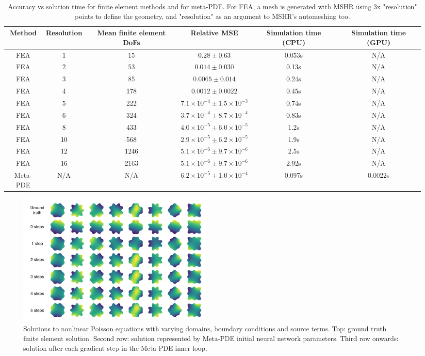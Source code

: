 \begin{table}
\begin{adjustbox}{max width=\textwidth}
\begin{tabular}{|c|ccccc|}
 \hline
 Method & Resolution & Mean finite element DoFs & Relative MSE & Simulation time (CPU) & Simulation time (GPU) \\
 \hline
 FEA & 1 & 15 & $0.28 \pm 0.63$ & 0.053s & N/A \\
 FEA & 2 & 53 & $0.014 \pm 0.030$ & 0.13s & N/A \\
 FEA & 3 & 85 & $0.0065 \pm 0.014$ & 0.24s & N/A \\
 FEA & 4 & 178 & $0.0012 \pm 0.0022$ & 0.45s & N/A \\
 FEA & 5 & 222 & $7.1\times 10^{-4} \pm 1.5\times 10^{-3}$ & 0.74s & N/A \\
 FEA & 6 & 324 & $3.7\times 10^{-4} \pm 8.7\times 10^{-4}$ & 0.83s & N/A \\
 FEA & 8 & 433 & $4.0\times 10^{-5} \pm 6.0\times 10^{-5}$ & 1.2s & N/A \\
 FEA & 10 & 568 & $2.9\times 10^{-5} \pm 6.2\times 10^{-5}$ & 1.9s & N/A \\
 FEA & 12 & 1246 & $5.1\times 10^{-6} \pm 9.7\times 10^{-6}$ & 2.5s & N/A \\
 FEA & 16 & 2163  & $5.1\times 10^{-6} \pm 9.7\times 10^{-6}$ & 2.92s & N/A \\
 Meta-PDE & N/A & N/A & $6.2\times 10^{-5} \pm 1.0\times 10^{-4}$  & 0.097s & 0.0022s \\
 \hline
\end{tabular}
\end{adjustbox}
\caption{
Accuracy vs solution time for finite element methods and for meta-PDE.
For FEA, a mesh is generated with MSHR using 3x "resolution" points
to define the geometry, and "resolution" as an argument to MSHR's
automeshing too.}
\label{tbl:results}
\end{table}

\begin{figure}[t]
  \centering
\includegraphics[width=10cm]{meta-pde/figures/poisson_meta_labeled.png}
\caption{\small
Solutions to nonlinear Poisson equations with varying domains, boundary conditions
and source terms. Top: ground truth finite element solution.
Second row: solution represented by Meta-PDE initial neural network parameters.
Third row onwards: solution after each gradient step in the Meta-PDE inner loop.}%
\label{fig:results_per_step}%
\end{figure}

